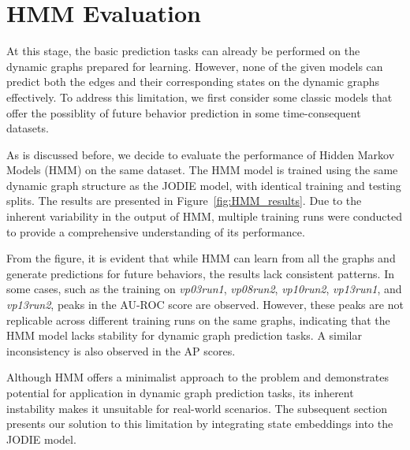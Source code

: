 \clearpage

\section{HMM Evaluation}



At this stage, the basic prediction tasks can already be performed on the dynamic graphs prepared for learning. However, none of the given models can predict both the edges and their corresponding states on the dynamic graphs effectively. To address this limitation, we first consider some classic models that offer the possiblity of future behavior prediction in some time-consequent datasets.

As is discussed before, we decide to evaluate the performance of Hidden Markov Models (HMM) on the same dataset. The HMM model is trained using the same dynamic graph structure as the JODIE model, with identical training and testing splits. The results are presented in Figure~\ref{fig:HMM_results}. Due to the inherent variability in the output of HMM, multiple training runs were conducted to provide a comprehensive understanding of its performance.

From the figure, it is evident that while HMM can learn from all the graphs and generate predictions for future behaviors, the results lack consistent patterns. In some cases, such as the training on \textit{vp03run1}, \textit{vp08run2}, \textit{vp10run2}, \textit{vp13run1}, and \textit{vp13run2}, peaks in the AU-ROC score are observed. However, these peaks are not replicable across different training runs on the same graphs, indicating that the HMM model lacks stability for dynamic graph prediction tasks. A similar inconsistency is also observed in the AP scores.

Although HMM offers a minimalist approach to the problem and demonstrates potential for application in dynamic graph prediction tasks, its inherent instability makes it unsuitable for real-world scenarios. The subsequent section presents our solution to this limitation by integrating state embeddings into the JODIE model.


